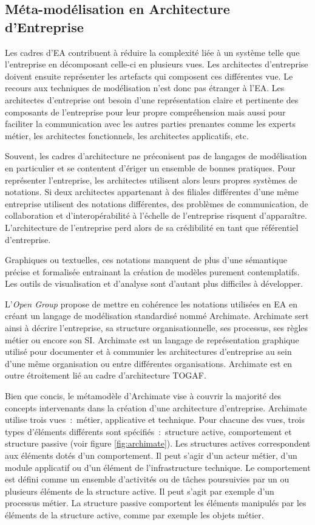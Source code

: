 \subsection{Méta-modélisation en Architecture d'Entreprise}

Les cadres d'EA contribuent à réduire la complexité liée à un système telle que l'entreprise en décomposant celle-ci en plusieurs vues. Les architectes d'entreprise doivent ensuite représenter les artefacts qui composent ces différentes vue. Le recours aux techniques de modélisation n'est donc pas étranger à l'EA. Les architectes d'entreprise ont besoin d'une représentation claire et pertinente des composants de l'entreprise pour leur propre compréhension mais aussi pour faciliter la communication avec les autres parties prenantes comme les experts métier, les architectes fonctionnels, les architectes applicatifs, etc. 

Souvent, les cadres d'architecture ne préconisent pas de langages de modélisation en particulier et se contentent d'ériger un ensemble de bonnes pratiques. Pour représenter l'entreprise, les architectes utilisent alors leurs propres systèmes de notations. Si deux architectes appartenant à des filiales différentes d'une même entreprise utilisent des notations différentes, des problèmes de communication, de collaboration et d'interopérabilité à l'échelle de l'entreprise risquent d'apparaître. L'architecture de l'entreprise perd alors de sa crédibilité en tant que référentiel d'entreprise.

Graphiques ou textuelles, ces notations manquent de plus d'une sémantique précise et formalisée entrainant la création de modèles purement contemplatifs. Les outils de visualisation et d'analyse sont d'autant plus difficiles à développer.

L'\textit{Open Group} propose de mettre en cohérence les notations utilisées en EA en créant un langage de modélisation standardisé nommé Archimate. Archimate sert ainsi à décrire l'entreprise, sa structure organisationnelle, ses processus, ses règles métier ou encore son SI. Archimate est un langage de représentation graphique utilisé pour documenter et à communier les architectures d'entreprise au sein d'une même organisation ou entre différentes organisations. Archimate est en outre étroitement lié au cadre d'architecture TOGAF. 

Bien que concis, le métamodèle d'Archimate vise à couvrir la majorité des concepts intervenants dans la création d'une architecture d'entreprise. Archimate utilise trois vues~:~métier, applicative et technique. Pour chacune des vues, trois types d'éléments différents sont spécifiés~:~structure active, comportement et structure passive (voir figure \ref{fig:archimate}). Les structures actives correspondent aux éléments dotés d'un comportement. Il peut s'agir d'un acteur métier, d'un module applicatif ou d'un élément de l'infrastructure technique. Le comportement est défini comme un ensemble d'activités ou de tâches poursuivies par un ou plusieurs éléments de la structure active. Il peut s'agit par exemple d'un processus métier. La structure passive comportent les éléments manipulés par les éléments de la structure active, comme par exemple les objets métier. 

